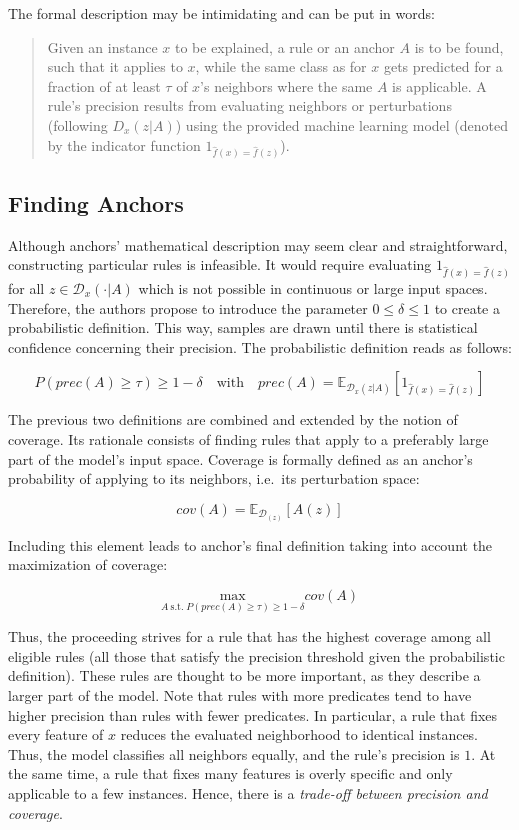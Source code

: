 \documentclass[
  11pt,
]{scrbook}
\begin{document}
The formal description may be intimidating and can be put in words:

\begin{quote}
Given an instance \(x\) to be explained, a rule or an anchor \(A\) is to be found, such that it applies to \(x\), while the same class as for \(x\) gets predicted for a fraction of at least \(\tau\) of \(x\)'s neighbors where the same \(A\) is applicable. A rule's precision results from evaluating neighbors or perturbations (following \(D_x (z|A)\)) using the provided machine learning model (denoted by the indicator function \(1_{\hat{f}(x) = \hat{f}(z)}\)).
\end{quote}

\hypertarget{finding-anchors}{%
\subsection{Finding Anchors}\label{finding-anchors}}

Although anchors' mathematical description may seem clear and straightforward, constructing particular rules is infeasible. It would require evaluating \(1_{\hat{f}(x) = \hat{f}(z)}\) for all \(z \in \mathcal{D}_x(\cdot|A)\) which is not possible in continuous or large input spaces. Therefore, the authors propose to introduce the parameter \(0 \leq \delta \leq 1\) to create a probabilistic definition. This way, samples are drawn until there is statistical confidence concerning their precision. The probabilistic definition reads as follows:

\[P(prec(A)\geq\tau)\geq{}1-\delta\quad\textrm{with}\quad{}prec(A)=\mathbb{E}_{\mathcal{D}_x(z|A)}[1_{\hat{f}(x)=\hat{f}(z)}]\]

The previous two definitions are combined and extended by the notion of coverage. Its rationale consists of finding rules that apply to a preferably large part of the model's input space. Coverage is formally defined as an anchor's probability of applying to its neighbors, i.e.~its perturbation space:

\[cov(A)=\mathbb{E}_{\mathcal{D}_{(z)}}[A(z)]\]

Including this element leads to anchor's final definition taking into account the maximization of coverage:

\[\underset{A\:\textrm{s.t.}\;P(prec(A)\geq\tau)\geq{}1-\delta}{\textrm{max}}cov(A)\]

Thus, the proceeding strives for a rule that has the highest coverage among all eligible rules (all those that satisfy the precision threshold given the probabilistic definition). These rules are thought to be more important, as they describe a larger part of the model.
Note that rules with more predicates tend to have higher precision than rules with fewer predicates. In particular, a rule that fixes every feature of \(x\) reduces the evaluated neighborhood to identical instances. Thus, the model classifies all neighbors equally, and the rule's precision is \(1\). At the same time, a rule that fixes many features is overly specific and only applicable to a few instances. Hence, there is a \emph{trade-off between precision and coverage}.
\end{document}
